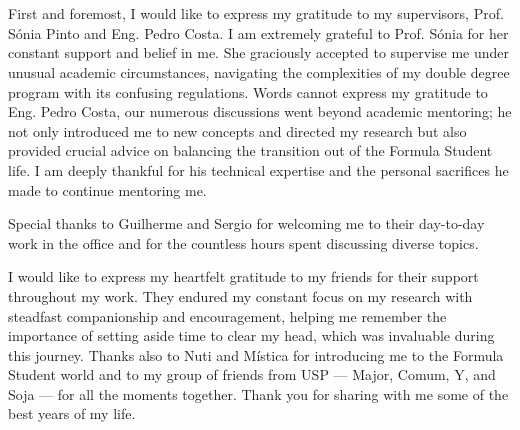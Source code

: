 
\section*{\acknowledgments}


First and foremost, I would like to express my gratitude to my supervisors, Prof. Sónia Pinto and Eng. Pedro Costa. I am extremely grateful to Prof. Sónia for her constant support and belief in me. She graciously accepted to supervise me under unusual academic circumstances, navigating the complexities of my double degree program with its confusing regulations. Words cannot express my gratitude to Eng. Pedro Costa, our numerous discussions went beyond academic mentoring; he not only introduced me to new concepts and directed my research but also provided crucial advice on balancing the transition out of the Formula Student life. I am deeply thankful for his technical expertise and the personal sacrifices he made to continue mentoring me.

Special thanks to Guilherme and Sergio for welcoming me to their day-to-day work in the office and for the countless hours spent discussing diverse topics.

I would like to express my heartfelt gratitude to my friends for their support throughout my work. They endured my constant focus on my research with steadfast companionship and encouragement, helping me remember the importance of setting aside time to clear my head, which was invaluable during this journey. Thanks also to Nuti and Mística for introducing me to the Formula Student world and to my group of friends from USP — Major, Comum, Y, and Soja — for all the moments together. Thank you for sharing with me some of the best years of my life.

